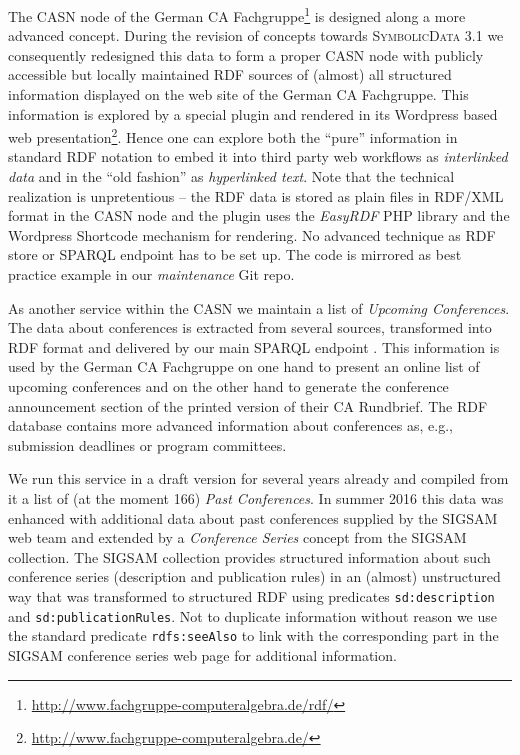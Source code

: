 \documentclass[a4paper,11pt]{article}
\def\SD{\textsc{Symbolic\-Data}}
\begin{document}
\begin{multicols}{2}
The CASN node of the German CA Fachgruppe\footnote{
  \url{http://www.fachgruppe-computeralgebra.de/rdf/}} is designed along a more
advanced concept. During the revision of concepts towards {\SD} 3.1 we
consequently redesigned this data to form a proper CASN node with publicly
accessible but locally maintained RDF sources of (almost) all structured
information displayed on the web site of the German CA Fachgruppe.  This
information is explored by a special plugin and rendered in its Wordpress based
web presentation\footnote{ \url{http://www.fachgruppe-computeralgebra.de/}}.
Hence one can explore both the ``pure'' information in standard RDF notation to
embed it into third party web workflows as \emph{interlinked data} and in the
``old fashion'' as \emph{hyperlinked text}.  Note that the technical
realization is unpretentious -- the RDF data is stored as plain files in
RDF/XML format in the CASN node and the plugin uses the \emph{EasyRDF} PHP
library and the Wordpress Shortcode mechanism for rendering.  No advanced
technique as RDF store or SPARQL endpoint has to be set up.  The code is
mirrored as best practice example in our \emph{maintenance} Git repo.


As another service within the CASN we maintain a list of \emph{Upcoming
  Conferences}.  The data about conferences is extracted from several sources,
transformed into RDF format and delivered by our main SPARQL endpoint
\cite{sdsparql}.  This information is used by the German CA Fachgruppe on one
hand to present an online list of upcoming conferences and on the other hand to
generate the conference announcement section of the printed version of their CA
Rundbrief.  The RDF database contains more advanced information about
conferences as, e.g., submission deadlines or program committees.

We run this service in a draft version for several years already and compiled
from it a list of (at the moment 166) \emph{Past Conferences}. In summer 2016
this data was enhanced with additional data about past conferences supplied by
the SIGSAM web team and extended by a \emph{Conference Series} concept from the
SIGSAM collection.  The SIGSAM collection provides structured information about
such conference series (description and publication rules) in an (almost)
unstructured way that was transformed to structured RDF using predicates
\texttt{sd:description} and \texttt{sd:publicationRules}.  Not to duplicate
information without reason we use the standard predicate \texttt{rdfs:seeAlso}
to link with the corresponding part in the SIGSAM conference series web page
for additional information.


\end{multicols}
\end{document}
